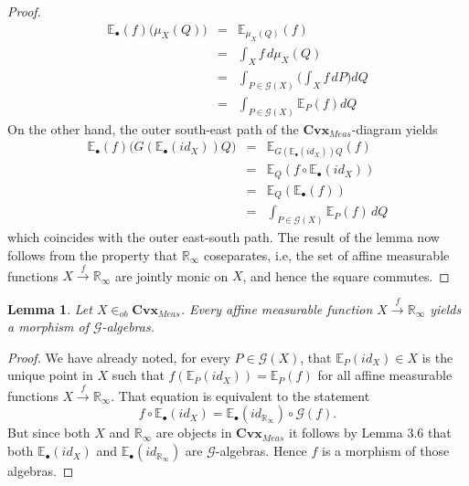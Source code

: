 \documentclass[11pt]{amsart}    %
\newtheorem{lemma}{Lemma}
\newcommand{\be}{\begin{equation}}
\newcommand{\ee}{\end{equation}}
\newcommand{\G}{\mathcal{G}}
\begin{document}
\begin{proof}
\be 
\begin{array}{lcl}
\mathbb{E}_{\bullet}(f) \big( \mu_X(Q) \big) &=& \mathbb{E}_{\mu_X(Q)}(f) \\
& =& \int_X f \, d\mu_X(Q) \\
&=& \int_{P \in \G(X)} \big( \int_X f \, dP\big)dQ \\
&=& \int_{P \in \G(X)} \mathbb{E}_P(f)dQ
\end{array}
\ee
On the other hand, the outer south-east path  of the $\mathbf{Cvx}_{Meas}$-diagram  yields
\be
\begin{array}{lcl}
 \mathbb{E}_{\bullet}(f)\big( G(\mathbb{E}_{\bullet}(id_X))Q \big) &=&
\mathbb{E}_{G( \mathbb{E}_{\bullet}(id_X))Q}(f)  \\
&=& \mathbb{E}_Q(f \circ \mathbb{E}_{\bullet}(id_X)) \\
&=& \mathbb{E}_Q(\mathbb{E}_{\bullet}(f)) \\
&=& \int_{P \in \G(X)} \mathbb{E}_P(f) \, dQ
\end{array}
\ee
which coincides with the outer east-south path.
 The result of the lemma now follows from the property that $\mathbb{R}_{\infty}$ coseparates, i.e, the set of affine measurable functions $X  \xrightarrow{f} \mathbb{R}_{\infty}$ are jointly monic on $X$, and hence the square commutes.

\end{proof}

\begin{lemma} \label{Lemma5} Let $X \in_{ob} \mathbf{Cvx}_{Meas}$. Every affine measurable function $X \xrightarrow{f} \mathbb{R}_{\infty}$ yields a morphism of $\G$-algebras.
\end{lemma}
\begin{proof} 
We have already noted, for every $P \in \G(X)$, that   $\mathbb{E}_P(id_X) \in X$ is the unique point in $X$ such that $f(\mathbb{E}_{P}(id_X)) = \mathbb{E}_P(f)$ for all affine measurable functions $X \xrightarrow{f} \mathbb{R}_{\infty}$.
That equation is equivalent to the statement 
$$
f \circ \mathbb{E}_{\bullet}(id_X) = \mathbb{E}_{\bullet}(id_{\mathbb{R}_{\infty}}) \circ \G(f).
$$
But since both $X$ and $\mathbb{R}_{\infty}$ are objects in $\mathbf{Cvx}_{Meas}$ it follows by  Lemma 3.6 that both $\mathbb{E}_{\bullet}(id_X)$ and $\mathbb{E}_{\bullet}(id_{\mathbb{R}_{\infty}})$ are $\G$-algebras. Hence $f$ is a morphism of those algebras.
\end{proof}
\end{document}
